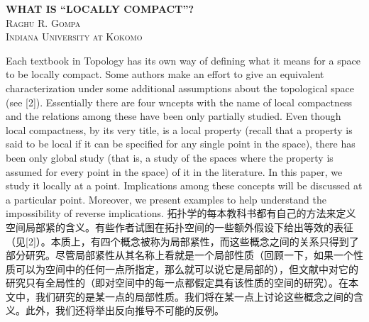 \documentclass[options]{article}
\begin{document}
\newenvironment{remark}{
	\begin{center}
		\begin{minipage}{0.8\textwidth}\linespread{1.3}\selectfont\itshape Remark: }{\end{minipage}
	\end{center}
}
\newenvironment{en}{}{\switchcolumn}
\newenvironment{cn}{\linespread{1.3}\selectfont}{\switchcolumn*}
\begin{center}{\bf\Huge{WHAT IS ``LOCALLY COMPACT''?
		}}\\
	{\scshape{Raghu R. Gompa\\Indiana University at Kokomo}}
\end{center}

\begin{paracol}{2}
	\begin{en}
		Each textbook in Topology has its own way of defining what it means for a space to be locally compact. Some authors make an effort to give an equivalent characterization under some additional assumptions about the topological space (see [2]). Essentially there are four wncepts with the name of local compactness and the relations among these have been only partially studied. Even though local compactness, by its very title, is a local property (recall that a property is said to be local if it can be specified for any single point in the space), there has been only global study (that is, a study of the spaces where the property is assumed for every point in the space) of it in the literature. In this paper, we study it locally at a point. Implications among these concepts will be discussed at a particular point. Moreover, we present examples to help understand the impossibility of reverse implications.
	\end{en}
	\begin{cn}
		拓扑学的每本教科书都有自己的方法来定义空间局部紧的含义。有些作者试图在拓扑空间的一些额外假设下给出等效的表征（见[2]）。本质上，有四个概念被称为局部紧性，而这些概念之间的关系只得到了部分研究。尽管局部紧性从其名称上看就是一个局部性质（回顾一下，如果一个性质可以为空间中的任何一点所指定，那么就可以说它是局部的），但文献中对它的研究只有全局性的（即对空间中的每一点都假定具有该性质的空间的研究）。在本文中，我们研究的是某一点的局部性质。我们将在某一点上讨论这些概念之间的含义。此外，我们还将举出反向推导不可能的反例。
	\end{cn}
	\begin{en}

\end{en}
\end{paracol}
\end{document}
